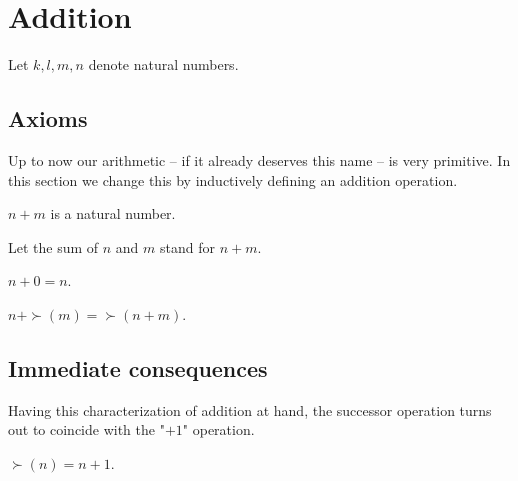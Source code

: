 \documentclass[../../arithmetic.tex]{subfiles}
\begin{document}
  \section{Addition}

  \begin{forthel}
  \end{forthel}

  \begin{forthel}
    Let $k, l, m, n$ denote natural numbers.
  \end{forthel}


  \subsection{Axioms}

  Up to now our arithmetic -- if it already deserves this name -- is very
  primitive. In this section we change this by inductively defining an addition
  operation.

  \begin{forthel}
    \begin{signature}
      $n + m$ is a natural number.
    \end{signature}

    Let the sum of $n$ and $m$ stand for $n + m$.

    \begin{axiom}\label{Arithmetic_01_02_190669}
      $n + 0 = n$.
    \end{axiom}

    \begin{axiom}\label{Arithmetic_01_02_110889}
      $n + \succ(m) = \succ(n + m)$.
    \end{axiom}
  \end{forthel}


  \subsection{Immediate consequences}

  Having this characterization of addition at hand, the successor operation
  turns out to coincide with the "$+ 1$" operation.

  \begin{forthel}
    \begin{lemma}
      $\succ(n) = n + 1$.
    \end{lemma}
  \end{forthel}
\end{document}
